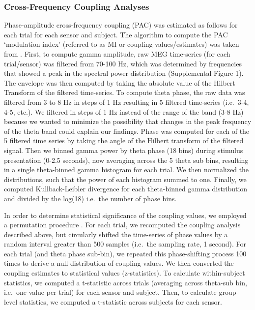 \subsubsection{Cross-Frequency Coupling
Analyses}\label{cross-frequency-coupling-analyses}

Phase-amplitude cross-frequency coupling (PAC) was estimated as follows
for each trial for each sensor and subject. The algorithm to compute the
PAC `modulation index' (referred to as MI or coupling values/estimates)
was taken from \textcite{tort_measuring_2010}. First, to compute gamma
amplitude, raw MEG time-series (for each trial/sensor) was filtered from
70-100 Hz, which was determined by frequencies that showed a peak in the
spectral power distribution (Supplemental Figure 1). The envelope was
then computed by taking the absolute value of the Hilbert Transform of
the filtered time-series. To compute theta phase, the raw data was
filtered from 3 to 8 Hz in steps of 1 Hz resulting in 5 filtered
time-series (i.e.~3-4, 4-5, etc.). We filtered in steps of 1 Hz instead
of the range of the band (3-8 Hz) because we wanted to minimize the
possibility that changes in the peak frequency of the theta band could
explain our findings. Phase was computed for each of the 5 filtered time
series by taking the angle of the Hilbert transform of the filtered
signal. Then we binned gamma power by theta phase (18 bins) during
stimulus presentation (0-2.5 seconds), now averaging across the 5 theta
sub bins, resulting in a single theta-binned gamma histogram for each
trial. We then normalized the distributions, such that the power of each
histogram summed to one. Finally, we computed Kullback-Leibler
divergence for each theta-binned gamma distribution and divided by the
log(18) i.e.~the number of phase bins.

In order to determine statistical significance of the coupling values,
we employed a permutation procedure \autocite{canolty_high_2006}. For
each trial, we recomputed the coupling analysis described above, but
circularly shifted the time-series of phase values by a random interval
greater than 500 samples (i.e.~the sampling rate, 1 second). For each
trial (and theta phase sub-bin), we repeated this phase-shifting process
100 times to derive a null distribution of coupling values. We then
converted the coupling estimates to statistical values (z-statistics).
To calculate within-subject statistics, we computed a t-statistic across
trials (averaging across theta-sub bin, i.e.~one value per trial) for
each sensor and subject. Then, to calculate group-level statistics, we
computed a t-statistic across subjects for each sensor.

